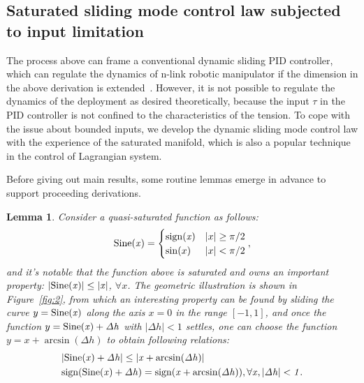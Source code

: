 \documentclass[3p]{elsarticle}
\theoremstyle{plain}
\newtheorem{mylem}{Lemma}
\theoremstyle{remark}
\begin{document}
\subsection{Saturated sliding mode control law subjected to input limitation}
The process above can frame a conventional dynamic sliding PID controller, which can regulate the dynamics of n-link robotic manipulator if the dimension in the above derivation  is extended~\cite{parra2003dynamic}. However, it is not possible to regulate the dynamics of the deployment as desired theoretically, because the input $\tau$ in the PID controller is not confined to the characteristics of the tension. To cope with the issue about bounded inputs, we develop the dynamic sliding mode control law with the experience of the saturated manifold, which is also a popular technique in the control of Lagrangian system.\par
Before giving out main results, some routine lemmas emerge in advance to support proceeding derivations.
\begin{mylem}\label{lemma:1}
Consider a quasi-saturated function as follows:
\begin{align}
\rm{Sine}\it{(x)} =
\begin{cases}
\rm{sign}\it{(x)}&\vert x\vert\ge\pi/2\\
\sin(x)&\vert x\vert<\pi/2
\end{cases},
\end{align}
and it's notable that the function above is saturated and owns an important property: $\vert \rm{Sine}\it{(x)}\vert\le\vert x\vert$, $\forall x$. The geometric illustration is shown in Figure~\ref{fig:2}, from which an interesting property can be found by sliding the curve $y=\rm{Sine}(\it{x})$ along the axis $x=0$ in the range $[-1,1]$, and once the function $y=\rm{Sine}\it{(x)}+\Delta h$ with $\vert\Delta h\vert<1$ settles, one can choose the function $y = x+\arcsin(\Delta h)$ to obtain following relations:
\begin{align}
&\vert \rm{Sine}\it{(x)}+\Delta h\vert\le\vert x+\arcsin(\Delta h)\vert\label{eq:lem11}\\
&\rm{sign}(\rm{Sine}\it{(x)}+\Delta h)=\rm{sign}(\it{x}+\arcsin(\Delta h)), \forall x, \vert\Delta h\vert<1\label{eq:lem12}.
\end{align}
\end{mylem}
\end{document}
